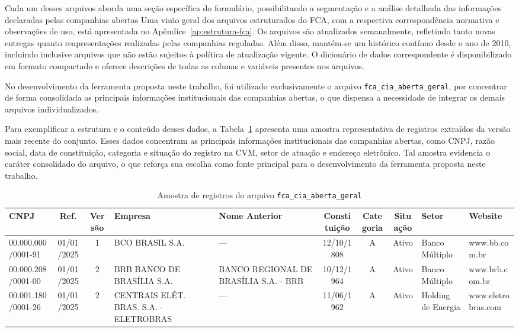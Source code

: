 Cada um desses arquivos aborda uma seção específica do formulário, possibilitando a segmentação e a análise detalhada das informações declaradas pelas companhias abertas Uma visão geral dos arquivos estruturados do FCA, com a respectiva correspondência normativa e observações de uso, está apresentada no Apêndice~\ref{ap:estrutura-fca}. Os arquivos são atualizados semanalmente, refletindo tanto novas entregas quanto reapresentações realizadas pelas companhias reguladas. Além disso, mantém-se um histórico contínuo desde o ano de 2010, incluindo inclusive arquivos que não estão sujeitos à política de atualização vigente. O dicionário de dados correspondente é disponibilizado em formato compactado e oferece descrições de todas as colunas e variáveis presentes nos arquivos.

No desenvolvimento da ferramenta proposta neste trabalho, foi utilizado exclusivamente o arquivo \texttt{fca\_cia\_aberta\_geral}, por concentrar de forma consolidada as principais informações institucionais das companhias abertas, o que dispensa a necessidade de integrar os demais arquivos individualizados.

Para exemplificar a estrutura e o conteúdo desses dados, a Tabela~\ref{tab:amostra_fca} apresenta uma amostra representativa de registros extraídos da versão mais recente do conjunto. Esses dados concentram as principais informações institucionais das companhias abertas, como CNPJ, razão social, data de constituição, categoria e situação do registro na CVM, setor de atuação e endereço eletrônico. Tal amostra evidencia o caráter consolidado do arquivo, o que reforça sua escolha como fonte principal para o desenvolvimento da ferramenta proposta neste trabalho.


\begin{table}[!htb]
	\centering
	\caption{Amostra de registros do arquivo \texttt{fca\_cia\_aberta\_geral}}
	\label{tab:amostra_fca}
	\scriptsize
	\begin{tabularx}{\textwidth}{|l|c|c|X|X|c|c|c|X|X|}
		\hline
		\textbf{CNPJ} & \textbf{Ref.} & \textbf{Versão} & \textbf{Empresa} & \textbf{Nome Anterior} & \textbf{Constituição} & \textbf{Categoria} & \textbf{Situação} & \textbf{Setor} & \textbf{Website} \\
		\hline
		00.000.000/0001-91 & 01/01/2025 & 1 & BCO BRASIL S.A. & --- & 12/10/1808 & A & Ativo & Banco Múltiplo & www.bb.com.br \\
		\hline
		00.000.208/0001-00 & 01/01/2025 & 2 & BRB BANCO DE BRASÍLIA S.A. & BANCO REGIONAL DE BRASÍLIA S.A. - BRB & 10/12/1964 & A & Ativo & Banco Múltiplo & www.brb.com.br \\
		\hline
		00.001.180/0001-26 & 01/01/2025 & 2 & CENTRAIS ELÉT. BRAS. S.A. - ELETROBRAS & --- & 11/06/1962 & A & Ativo & Holding de Energia & www.eletrobras.com \\
		\hline
	\end{tabularx}
\end{table}


